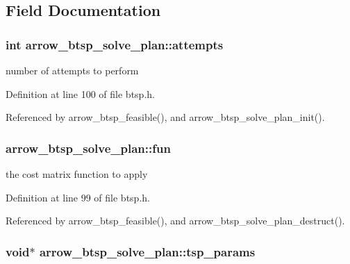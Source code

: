 \subsection{Field Documentation}
\hypertarget{structarrow__btsp__solve__plan_acfa3d4257a33548a9f60ee568219bc5}{
\subsubsection[{attempts}]{\setlength{\rightskip}{0pt plus 5cm}int {\bf arrow\_\-btsp\_\-solve\_\-plan::attempts}}}
\label{structarrow__btsp__solve__plan_acfa3d4257a33548a9f60ee568219bc5}


number of attempts to perform 

Definition at line 100 of file btsp.h.

Referenced by arrow\_\-btsp\_\-feasible(), and arrow\_\-btsp\_\-solve\_\-plan\_\-init().\hypertarget{structarrow__btsp__solve__plan_89fa2ad1bcc026cd50fd7abc6c30ce3e}{
\subsubsection[{fun}]{ {\bf arrow\_\-btsp\_\-solve\_\-plan::fun}}}
\label{structarrow__btsp__solve__plan_89fa2ad1bcc026cd50fd7abc6c30ce3e}


the cost matrix function to apply 

Definition at line 99 of file btsp.h.

Referenced by arrow\_\-btsp\_\-feasible(), and arrow\_\-btsp\_\-solve\_\-plan\_\-destruct().\hypertarget{structarrow__btsp__solve__plan_2b7cf65583f45c990218139dbae34ae5}{
\subsubsection[{tsp\_\-params}]{\setlength{\rightskip}{0pt plus 5cm}void$\ast$ {\bf arrow\_\-btsp\_\-solve\_\-plan::tsp\_\-params}}}
\label{structarrow__btsp__solve__plan_2b7cf65583f45c990218139dbae34ae5}


